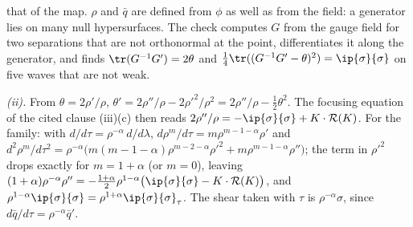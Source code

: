 that of the map. $\rho$ and $\bar q$ are defined from $\phi$ as well as from the field: a generator lies on many null hypersurfaces. The check computes $G$ from the gauge field for two separations that are not orthonormal at the point, differentiates it along the generator, and finds $\tr(G^{-1}G') = 2\theta$ and $\tfrac14\tr((G^{-1}G' - \theta)^{2}) = \ip{\sigma}{\sigma}$ on five waves that are not weak.

\emph{(ii).} From $\theta = 2\rho'/\rho$, $\theta' = 2\rho''/\rho - 2\rho'^{2}/\rho^{2} = 2\rho''/\rho - \tfrac12\theta^{2}$. The focusing equation of the cited clause (iii)(c) then reads $2\rho''/\rho = -\ip{\sigma}{\sigma} + K \cdot \mathcal{R}(K)$. For the family: with $d/d\tau = \rho^{-\alpha}\,d/d\lambda$, $d\rho^{m}/d\tau = m\rho^{m - 1 - \alpha}\rho'$ and $d^{2}\rho^{m}/d\tau^{2} = \rho^{-\alpha}\bigl(m(m - 1 - \alpha)\rho^{m - 2 - \alpha}\rho'^{2} + m\rho^{m - 1 - \alpha}\rho''\bigr)$; the term in $\rho'^{2}$ drops exactly for $m = 1 + \alpha$ (or $m = 0$), leaving $(1 + \alpha)\rho^{-\alpha}\rho'' = -\tfrac{1 + \alpha}{2}\rho^{1 - \alpha}\bigl(\ip{\sigma}{\sigma} - K \cdot \mathcal{R}(K)\bigr)$, and $\rho^{1 - \alpha}\ip{\sigma}{\sigma} = \rho^{1 + \alpha}\ip{\sigma}{\sigma}_{\tau}$. The shear taken with $\tau$ is $\rho^{-\alpha}\sigma$, since $d\bar q/d\tau = \rho^{-\alpha}\bar q'$.

